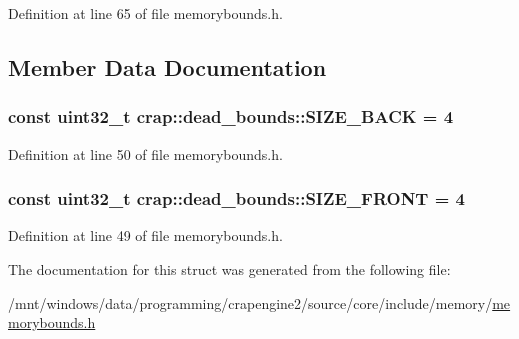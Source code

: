 Definition at line 65 of file memorybounds.\+h.



\subsection{Member Data Documentation}
\hypertarget{structcrap_1_1dead__bounds_a6267a01dd25345bf0e461e195f106e83}{
\subsubsection[{S\+I\+Z\+E\+\_\+\+B\+A\+C\+K}]{\setlength{\rightskip}{0pt plus 5cm}const uint32\+\_\+t crap\+::dead\+\_\+bounds\+::\+S\+I\+Z\+E\+\_\+\+B\+A\+C\+K = 4\hspace{0.3cm}{\ttfamily [static]}}}\label{structcrap_1_1dead__bounds_a6267a01dd25345bf0e461e195f106e83}


Definition at line 50 of file memorybounds.\+h.

\hypertarget{structcrap_1_1dead__bounds_aacd105207fa9af97704d416ff4580807}{
\subsubsection[{S\+I\+Z\+E\+\_\+\+F\+R\+O\+N\+T}]{\setlength{\rightskip}{0pt plus 5cm}const uint32\+\_\+t crap\+::dead\+\_\+bounds\+::\+S\+I\+Z\+E\+\_\+\+F\+R\+O\+N\+T = 4\hspace{0.3cm}{\ttfamily [static]}}}\label{structcrap_1_1dead__bounds_aacd105207fa9af97704d416ff4580807}


Definition at line 49 of file memorybounds.\+h.



The documentation for this struct was generated from the following file\+:\begin{DoxyCompactItemize}
\item 
/mnt/windows/data/programming/crapengine2/source/core/include/memory/\hyperlink{memorybounds_8h}{memorybounds.\+h}\end{DoxyCompactItemize}
